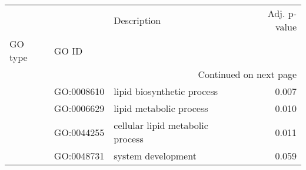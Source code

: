 \begin{longtable}{lllr}
\toprule
   &            &                       Description &  Adj. p-value \\
GO type & GO ID &                                   &               \\
\midrule
\endhead
\midrule
\multicolumn{4}{r}{{Continued on next page}} \\
\midrule
\endfoot

\bottomrule
\endlastfoot
\multirow{4}{*}{BP} & GO:0008610 &        lipid biosynthetic process &         0.007 \\
   & GO:0006629 &           lipid metabolic process &         0.010 \\
   & GO:0044255 &  cellular lipid metabolic process &         0.011 \\
   & GO:0048731 &                system development &         0.059 \\
\end{longtable}
